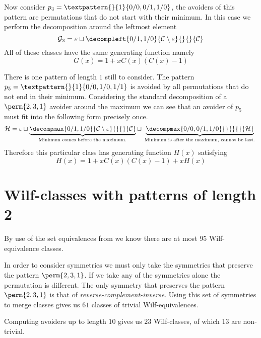 Now consider \(p_4 = \textpattern{}{1}{0/0,0/1,1/0}\), the avoiders of this
pattern are permutations that do not start with their minimum. In this case we
perform the decomposition around the leftmost element
\begin{equation*}
    \mathcal{G}_3 =\varepsilon \sqcup \decompleft{0/1,1/0}{\mathcal{C}\setminus\varepsilon}{}{}{\mathcal{C}}
\end{equation*}
All of these classes have the same generating function namely
\begin{equation*}
    G(x) = 1 + xC(x)(C(x)-1)
\end{equation*}

There is one pattern of length \(1\) still to consider. The pattern
\(p_5 = \textpattern{}{1}{0/0,1/0,1/1}\) is avoided by all permutations
that do not end in their minimum. Considering the standard decomposition
of a \(\perm{2,3,1}\) avoider around the maximum we can see that an avoider
of \(p_5\) must fit into the following form precisely once.
\begin{equation*}
    \mathcal{H} = \varepsilon \sqcup
    \underbrace{\decompmax{0/1,1/0}{\mathcal{C}\setminus\varepsilon}{}{}{\mathcal{C}}}_\text{
        Minimum comes before the maximum.
    } \sqcup
    \underbrace{\decompmax{0/0,0/1,1/0}{}{}{}{\mathcal{H}}}_\text{
        Minimum is after the maximum, cannot be last.
    }
\end{equation*}
Therefore this particular class has generating function \(H(x)\) satisfying
\begin{equation*}
    H(x) = 1 + xC(x)(C(x)-1) + xH(x)
\end{equation*}

\section{Wilf-classes with patterns of length 2}
By use of the set equivalences from  we know there are
at most \(95\) Wilf-equivalence classes.

In order to consider symmetries we must only take the symmetries that preserve
the pattern \(\perm{2,3,1}\). If we take any of the symmetries alone the
permutation is different. The only symmetry that preserves the pattern
\(\perm{2,3,1}\) is that of \emph{reverse-complement-inverse}. Using this
set of symmetries to merge classes gives us \(61\) classes of trivial
Wilf-equivalences.

Computing avoiders up to length \(10\) gives us \(23\) Wilf-classes,
of which \(13\) are non-trivial.

